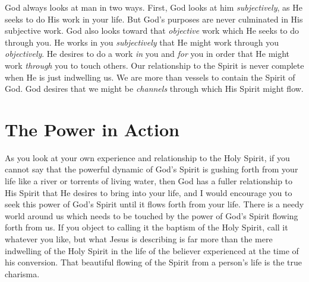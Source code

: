 God always looks at man in two ways. First, God looks at him \emph{subjectively}, as He seeks to do His work in your life. But God's purposes are never culminated in His subjective work. God also looks toward that \emph{objective} work which He seeks to do through you. He works in you \emph{subjectively} that He might work through you \emph{objectively}. He desires to do a work \emph{in} you and \emph{for} you in order that He might work \emph{through} you to touch others. Our relationship to the Spirit is never complete when He is just indwelling us. We are more than vessels to contain the Spirit of God. God desires that we might be \emph{channels} through which His Spirit might flow. 

\section*{The Power in Action}

As you look at your own experience and relationship to the Holy Spirit, if you cannot say that the powerful dynamic of God's Spirit is gushing forth from your life like a river or torrents of living water, then God has a fuller relationship to His Spirit that He desires to bring into your life, and I would encourage you to seek this power of God's Spirit until it flows forth from your life. There is a needy world around us which needs to be touched by the power of God's Spirit flowing forth from us. If you object to calling it the baptism of the Holy Spirit, call it whatever you like, but what Jesus is describing is far more than the mere indwelling of the Holy Spirit in the life of the believer experienced at the time of his conversion. That beautiful flowing of the Spirit from a person's life is the true charisma. 



